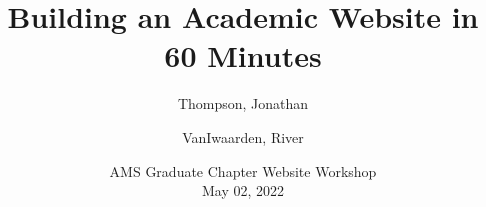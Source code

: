 \documentclass{beamer}
\title[Academic Websites with Hugo]{Building an Academic Website in 60 Minutes}
\author[Thompson, VanIwaarden]{
  Thompson, Jonathan\\
  \and
  VanIwaarden, River\\
}
\institute[UCCS]{University of Colorado at Colorado Springs}
\date[UCCS 2022]
{AMS Graduate Chapter Website Workshop \\ May 02, 2022}
\begin{document}
\beamertemplatenavigationsymbolsempty

\frame{\titlepage}
























\end{document}
